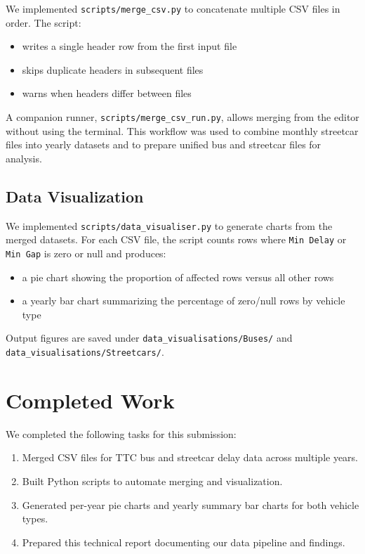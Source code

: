 \documentclass[11pt]{article}
\begin{document}
We implemented \texttt{scripts/merge\_csv.py} to concatenate multiple CSV files in order. The script:

\begin{itemize}[noitemsep]
    \item writes a single header row from the first input file
    \item skips duplicate headers in subsequent files
    \item warns when headers differ between files
\end{itemize}

A companion runner, \texttt{scripts/merge\_csv\_run.py}, allows merging from the editor without using
the terminal. This workflow was used to combine monthly streetcar files into yearly datasets and to
prepare unified bus and streetcar files for analysis.

\subsection{Data Visualization}

We implemented \texttt{scripts/data\_visualiser.py} to generate charts from the merged datasets. For
each CSV file, the script counts rows where \texttt{Min Delay} or \texttt{Min Gap} is zero or null
and produces:

\begin{itemize}[noitemsep]
    \item a pie chart showing the proportion of affected rows versus all other rows
    \item a yearly bar chart summarizing the percentage of zero/null rows by vehicle type
\end{itemize}

Output figures are saved under \texttt{data\_visualisations/Buses/} and
\texttt{data\_visualisations/Streetcars/}.

\section{Completed Work}

We completed the following tasks for this submission:

\begin{enumerate}
    \item Merged CSV files for TTC bus and streetcar delay data across multiple years.
    \item Built Python scripts to automate merging and visualization.
    \item Generated per-year pie charts and yearly summary bar charts for both vehicle types.
    \item Prepared this technical report documenting our data pipeline and findings.
\end{enumerate}
\end{document}

